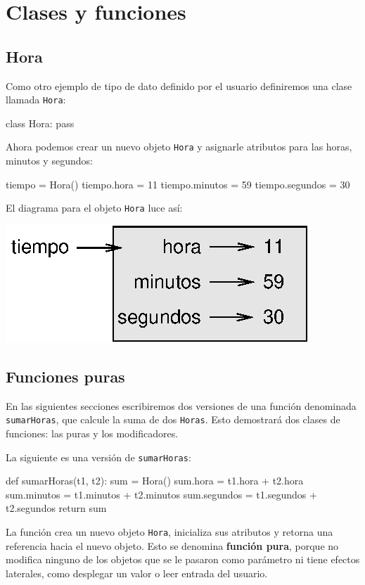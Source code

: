 
\chapter{Clases y funciones}

\label{time}  

\section{Hora}

Como otro ejemplo de tipo de dato definido por el usuario definiremos
una clase llamada \texttt{Hora}:
\begin{pythoncode}
class Hora:
  pass
\end{pythoncode}

Ahora podemos crear un nuevo objeto \texttt{Hora} y asignarle atributos
para las horas, minutos y segundos:
\begin{pythoncode}
tiempo = Hora()
tiempo.hora = 11
tiempo.minutos = 59
tiempo.segundos = 30
\end{pythoncode}

El diagrama para el objeto \texttt{Hora} luce así:

\beforefig \centerline{\includegraphics{illustrations/time}} \afterfig

\section{Funciones puras}

 

En las siguientes secciones escribiremos dos versiones de una función
denominada \texttt{sumarHoras}, que calcule la suma de dos \texttt{Horas}.
Esto demostrará dos clases de funciones: las puras y los modificadores.

La siguiente es una versión de \texttt{sumarHoras}:

\begin{pythoncode}
def sumarHoras(t1, t2):
  sum = Hora()
  sum.hora = t1.hora + t2.hora
  sum.minutos = t1.minutos + t2.minutos
  sum.segundos = t1.segundos + t2.segundos
  return sum
\end{pythoncode}
 La función crea un nuevo objeto \texttt{Hora}, inicializa sus atributos
y retorna una referencia hacia el nuevo objeto. Esto se denomina \textbf{función
pura}, porque no modifica ninguno de los objetos que se le pasaron
como parámetro ni tiene efectos laterales, como desplegar un valor
o leer entrada del usuario.

